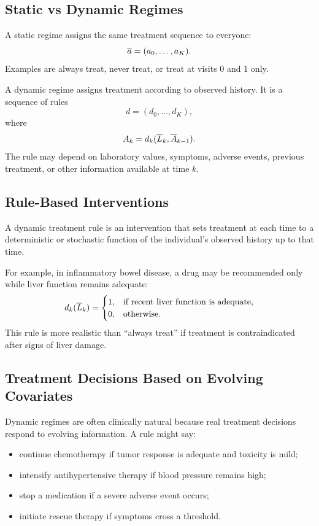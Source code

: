 \label{lec:8-11}

\subsection{Static vs Dynamic Regimes}

A static regime assigns the same treatment sequence to everyone:
\[
  \overline{a}=(a_0,\ldots,a_K).
\]
Examples are always treat, never treat, or treat at visits 0 and 1 only.

A dynamic regime assigns treatment according to observed history. It is a
sequence of rules
\[
  d=(d_0,\ldots,d_K),
\]
where
\[
  A_k=d_k(\overline{L}_k,\overline{A}_{k-1}).
\]
The rule may depend on laboratory values, symptoms, adverse events, previous
treatment, or other information available at time $k$.

\subsection{Rule-Based Interventions}

\begin{definition}
A dynamic treatment rule is an intervention that sets treatment at each time to
a deterministic or stochastic function of the individual's observed history up
to that time.
\end{definition}

For example, in inflammatory bowel disease, a drug may be recommended only while
liver function remains adequate:
\[
  d_k(\overline{L}_k)=
  \begin{cases}
  1, & \text{if recent liver function is adequate},\\
  0, & \text{otherwise}.
  \end{cases}
\]
This rule is more realistic than ``always treat'' if treatment is contraindicated
after signs of liver damage.

\subsection{Treatment Decisions Based on Evolving Covariates}

Dynamic regimes are often clinically natural because real treatment decisions
respond to evolving information. A rule might say:
\begin{itemize}
  \item continue chemotherapy if tumor response is adequate and toxicity is mild;
  \item intensify antihypertensive therapy if blood pressure remains high;
  \item stop a medication if a severe adverse event occurs;
  \item initiate rescue therapy if symptoms cross a threshold.
\end{itemize}

